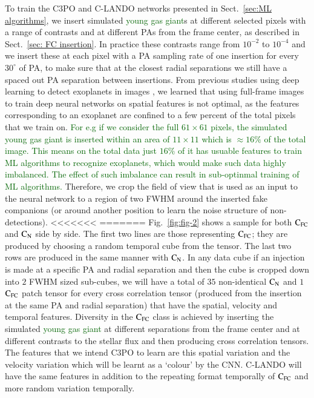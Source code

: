 \documentclass{aa}
\newcommand{\newchange}[1]{\textcolor{darkgreen}{#1}}
\begin{document}
{{{To train the C3PO and C-LANDO networks presented in Sect.~\ref{sec:ML algorithms}, we insert simulated \newchange{young gas giant}s at different selected pixels with a range of contrasts and at different PAs from the frame center, as described in Sect.~\ref{sec: FC insertion}.
In practice these contrasts range from $10^{-2}$ to $10^{-4}$ and we insert these at each pixel with a PA sampling rate of one insertion for every $30^{\circ}$ of PA, to make sure that at the closest radial separations we still have a spaced out PA separation between insertions. 
From previous studies using deep learning to detect exoplanets in images \citep[e.g.,][]{2018Gomez,2023Carlito}, we learned that using full-frame images to train deep neural networks on spatial features is not optimal, as the features corresponding to an exoplanet are confined to a few percent of the total pixels that we train on. 
\newchange{For e.g if we consider the full $61\times61$ pixels, the simulated \newchange{young gas giant} is inserted within an area of $11\times11$ which is $\approx 16\%$ of the total image.
This means on the total data just $16\%$ of it has usuable features to train ML algorithms to recognize exoplanets, which would make such data highly imbalanced.
The effect of such imbalance can result in sub-optinmal training of ML algorithms.}
Therefore, we crop the field of view that is used as an input to the neural network to a region of two FWHM around the inserted fake companions (or around another position to learn the noise structure of non-detections).
<<<<<<<
=======
Fig.~\ref{fig:fig-2} shows a sample for both $\rm{C_{FC}}$ and $\rm{C_N}$ side by side.
The first two lines are those representing $\rm{C_{FC}}$; they are produced by choosing a random temporal cube from the tensor.
The last two rows are produced in the same manner with $\rm{C_N}$.
In any data cube if an injection is made at a specific PA and radial separation and then the cube is cropped down into $2$ FWHM sized sub-cubes, we will have a total of $35$ non-identical $\rm{C_N}$ and $1$ $\rm{C_{FC}}$ patch tensor for every cross correlation tensor (produced from the insertion at the same PA and radial separation) that have the spatial, velocity and temporal features. 
Diversity in the $\rm{C_{FC}}$ class is achieved by inserting the simulated \newchange{young gas giant} at different separations from the frame center and at different contrasts to the stellar flux and then producing cross correlation tensors.
The features that we intend C3PO to learn are this spatial variation and the velocity variation which will be learnt as a ‘colour’ by the CNN. 
C-LANDO will have the same features in addition to the repeating format temporally of $\rm{C_{FC}}$ and more random variation temporally.

}}}
\end{document}
